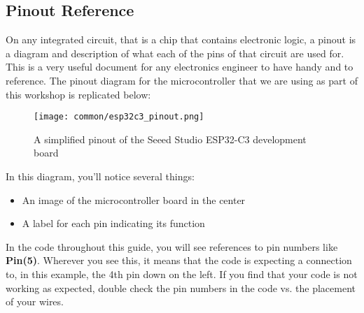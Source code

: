 \subsection{Pinout Reference} \label{pinout}
On any integrated circuit, that is a chip that contains electronic logic, a pinout is
a diagram and description of what each of the pins of that circuit are used for. This is
a very useful document for any electronics engineer to have handy and to reference. The
pinout diagram for the microcontroller that we are using as part of this workshop is
replicated below:
\begin{figure}[H]
\centering
    \texttt{[image: common/esp32c3\_pinout.png]}
    \caption{A simplified pinout of the Seeed Studio ESP32-C3 development board}
\end{figure}

In this diagram, you'll notice several things:
\begin{itemize}
    \item An image of the microcontroller board in the center
    \item A label for each pin indicating its function
\end{itemize}

In the code throughout this guide, you will see references to pin numbers like \textbf{Pin(5)}.
Wherever you see this, it means that the code is expecting a connection to, in this example, the
4th pin down on the left. If you find that your code is not working as expected, double check the
pin numbers in the code vs. the placement of your wires.